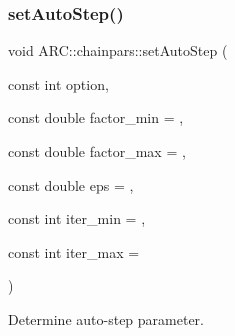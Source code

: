 \subsubsection{\texorpdfstring{set\+Auto\+Step()}{setAutoStep()}}
{\footnotesize\ttfamily void A\+R\+C\+::chainpars\+::set\+Auto\+Step (\begin{DoxyParamCaption}\item[{const int}]{option,  }\item[{const double}]{factor\+\_\+min = {},  }\item[{const double}]{factor\+\_\+max = {},  }\item[{const double}]{eps = {},  }\item[{const int}]{iter\+\_\+min = {},  }\item[{const int}]{iter\+\_\+max = {} }\end{DoxyParamCaption})\hspace{0.3cm}{\ttfamily [inline]}}



Determine auto-\/step parameter. 


